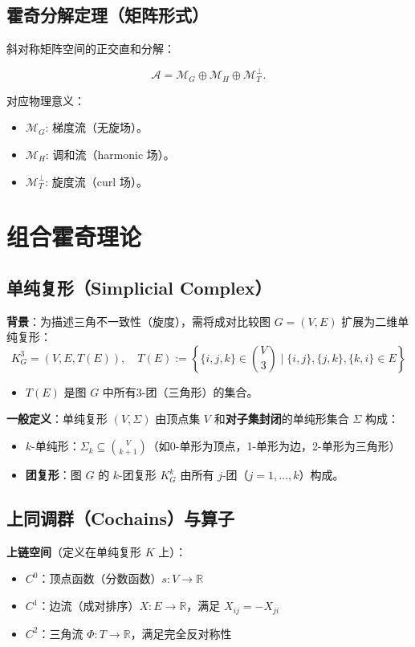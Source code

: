 \documentclass[a4paper]{article}
\begin{document}
\subsection{霍奇分解定理（矩阵形式）}
斜对称矩阵空间的正交直和分解：

\begin{equation}
\boxed{\mathcal{A} = \mathcal{M}_G \oplus \mathcal{M}_H \oplus \mathcal{M}_T^\perp}.
\tag{18}
\end{equation}

对应物理意义：
\begin{itemize}
    \item $\mathcal{M}_G$: 梯度流（无旋场）。
    \item $\mathcal{M}_H$: 调和流（harmonic 场）。
    \item $\mathcal{M}_T^\perp$: 旋度流（curl 场）。
\end{itemize}

\section{组合霍奇理论}
\subsection{单纯复形（Simplicial Complex）}

    \indent \textbf{背景}：为描述三角不一致性（旋度），需将成对比较图 \(G = (V, E)\) 扩展为二维单纯复形：
    \[
    K_G^3 = (V, E, T(E)), \quad T(E) := \left\{ \{i,j,k\} \in \binom{V}{3} \mid \{i,j\},\{j,k\},\{k,i\} \in E \right\}
    \]
    \begin{itemize}
        \item \(T(E)\) 是图 \(G\) 中所有3-团（三角形）的集合。
    \end{itemize}
    
    \indent \textbf{一般定义}：单纯复形 \((V, \Sigma)\) 由顶点集 \(V\) 和\textbf{对子集封闭}的单纯形集合 \(\Sigma\) 构成：
    \begin{itemize}
        \item \(k\)-单纯形：\(\Sigma_k \subseteq \binom{V}{k+1}\)（如0-单形为顶点，1-单形为边，2-单形为三角形）
        \item \textbf{团复形}：图 \(G\) 的 \(k\)-团复形 \(K_G^k\) 由所有 \(j\)-团（\(j=1,\dots,k\)）构成。
    \end{itemize}


\subsection{上同调群（Cochains）与算子}
\indent \textbf{上链空间}（定义在单纯复形 \(K\) 上）：
    \begin{itemize}
        \item \(C^0\)：顶点函数（分数函数）\(s: V \to \mathbb{R}\)
        \item \(C^1\)：边流（成对排序）\(X: E \to \mathbb{R}\)，满足 \(X_{ij} = -X_{ji}\)
        \item \(C^2\)：三角流 \(\Phi: T \to \mathbb{R}\)，满足完全反对称性
    \end{itemize}
    
\end{document}
